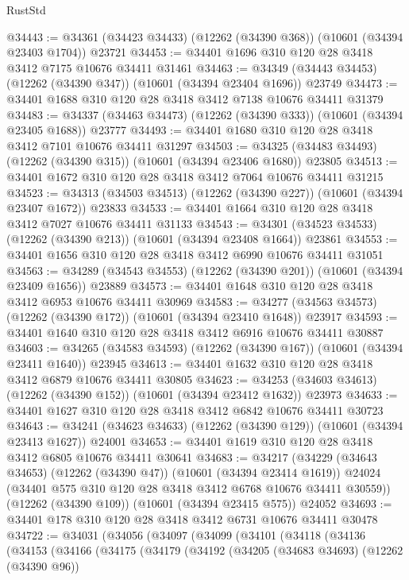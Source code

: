 \begin{lexlean}{RustStd}
\begin{coremodule}
@34443 := @34361 (@34423 @34433) (@12262 (@34390 @368)) (@10601 (@34394 @23403 @1704)) @23721
@34453 := @34401 @1696 @310 @120 @28 @3418 @3412 @7175 @10676 @34411 @31461
@34463 := @34349 (@34443 @34453) (@12262 (@34390 @347)) (@10601 (@34394 @23404 @1696)) @23749
@34473 := @34401 @1688 @310 @120 @28 @3418 @3412 @7138 @10676 @34411 @31379
@34483 := @34337 (@34463 @34473) (@12262 (@34390 @333)) (@10601 (@34394 @23405 @1688)) @23777
@34493 := @34401 @1680 @310 @120 @28 @3418 @3412 @7101 @10676 @34411 @31297
@34503 := @34325 (@34483 @34493) (@12262 (@34390 @315)) (@10601 (@34394 @23406 @1680)) @23805
@34513 := @34401 @1672 @310 @120 @28 @3418 @3412 @7064 @10676 @34411 @31215
@34523 := @34313 (@34503 @34513) (@12262 (@34390 @227)) (@10601 (@34394 @23407 @1672)) @23833
@34533 := @34401 @1664 @310 @120 @28 @3418 @3412 @7027 @10676 @34411 @31133
@34543 := @34301 (@34523 @34533) (@12262 (@34390 @213)) (@10601 (@34394 @23408 @1664)) @23861
@34553 := @34401 @1656 @310 @120 @28 @3418 @3412 @6990 @10676 @34411 @31051
@34563 := @34289 (@34543 @34553) (@12262 (@34390 @201)) (@10601 (@34394 @23409 @1656)) @23889
@34573 := @34401 @1648 @310 @120 @28 @3418 @3412 @6953 @10676 @34411 @30969
@34583 := @34277 (@34563 @34573) (@12262 (@34390 @172)) (@10601 (@34394 @23410 @1648)) @23917
@34593 := @34401 @1640 @310 @120 @28 @3418 @3412 @6916 @10676 @34411 @30887
@34603 := @34265 (@34583 @34593) (@12262 (@34390 @167)) (@10601 (@34394 @23411 @1640)) @23945
@34613 := @34401 @1632 @310 @120 @28 @3418 @3412 @6879 @10676 @34411 @30805
@34623 := @34253 (@34603 @34613) (@12262 (@34390 @152)) (@10601 (@34394 @23412 @1632)) @23973
@34633 := @34401 @1627 @310 @120 @28 @3418 @3412 @6842 @10676 @34411 @30723
@34643 := @34241 (@34623 @34633) (@12262 (@34390 @129)) (@10601 (@34394 @23413 @1627)) @24001
@34653 := @34401 @1619 @310 @120 @28 @3418 @3412 @6805 @10676 @34411 @30641
@34683 := @34217
    (@34229
      (@34643 @34653)
      (@12262 (@34390 @47))
      (@10601 (@34394 @23414 @1619))
      @24024
      (@34401 @575 @310 @120 @28 @3418 @3412 @6768 @10676 @34411 @30559))
    (@12262 (@34390 @109))
    (@10601 (@34394 @23415 @575))
    @24052
@34693 := @34401 @178 @310 @120 @28 @3418 @3412 @6731 @10676 @34411 @30478
@34722 := @34031
    (@34056
      (@34097
        (@34099
          (@34101
            (@34118
              (@34136
                (@34153
                  (@34166
                    (@34175
                      (@34179
                        (@34192
                          (@34205
                            (@34683 @34693)
                            (@12262 (@34390 @96))

\end{coremodule}
\end{lexlean}
